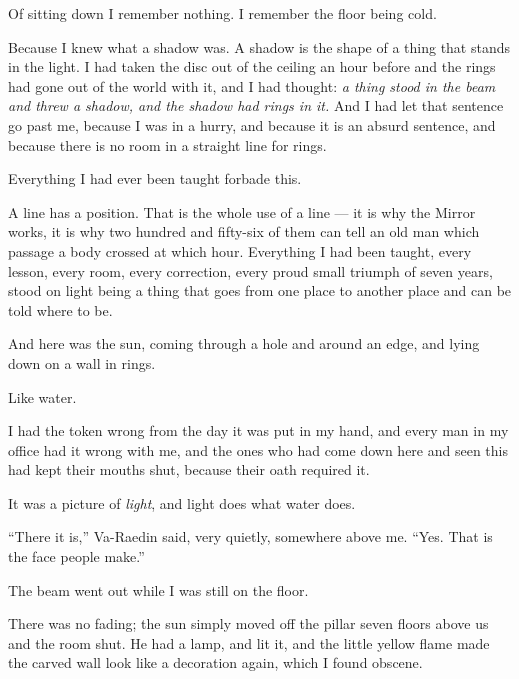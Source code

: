 Of sitting down I remember nothing. I remember the floor being cold.\par

Because I knew what a shadow was. A shadow is the shape of a thing that stands in the light. I had taken the disc out of the ceiling an hour before and the rings had gone out of the world with it, and I had thought: \textit{a thing stood in the beam and threw a shadow, and the shadow had rings in it.} And I had let that sentence go past me, because I was in a hurry, and because it is an absurd sentence, and because there is no room in a straight line for rings.\par

Everything I had ever been taught forbade this.\par

A line has a position. That is the whole use of a line --- it is why the Mirror works, it is why two hundred and fifty-six of them can tell an old man which passage a body crossed at which hour. Everything I had been taught, every lesson, every room, every correction, every proud small triumph of seven years, stood on light being a thing that goes from one place to another place and can be told where to be.\par

And here was the sun, coming through a hole and around an edge, and lying down on a wall in rings.\par

Like water.\par

I had the token wrong from the day it was put in my hand, and every man in my office had it wrong with me, and the ones who had come down here and seen this had kept their mouths shut, because their oath required it.\par

It was a picture of \textit{light}, and light does what water does.\par

``There it is,'' Va-Raedin said, very quietly, somewhere above me. ``Yes. That is the face people make.''\par

\ornament

The beam went out while I was still on the floor.\par

There was no fading; the sun simply moved off the pillar seven floors above us and the room shut. He had a lamp, and lit it, and the little yellow flame made the carved wall look like a decoration again, which I found obscene.\par

